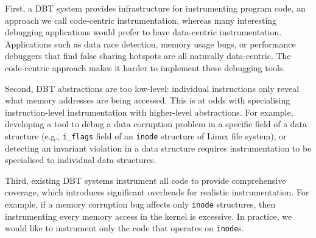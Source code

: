 
First, a DBT system provides infrastructure for instrumenting program code, an approach we call code-centric instrumentation, whereas many interesting debugging applications would prefer to have data-centric instrumentation. Applications such as data race detection, memory usage bugs, or performance debuggers that find false sharing hotspots are all naturally data-centric. The code-centric approach makes it harder to implement these debugging tools. 


Second, DBT abstractions are too low-level: individual instructions only reveal what memory addresses are being accessed. This is at odds with specialising instruction-level instrumentation with higher-level abstractions. For example, developing a tool to debug a data corruption problem in a specific field of a data structure (e.g., \texttt{i\_flags} field of an \texttt{inode} structure of Linux file system), or detecting an invariant violation in a data structure requires instrumentation to be specialised to individual data structures.

Third, existing DBT systems instrument all code to provide comprehensive coverage, which introduces significant overheads for realistic instrumentation. For example, if a memory corruption bug affects only \texttt{inode} structures, then instrumenting every memory access in the kernel is excessive. In practice, we would like to instrument only the code that operates on \texttt{inode}s.




